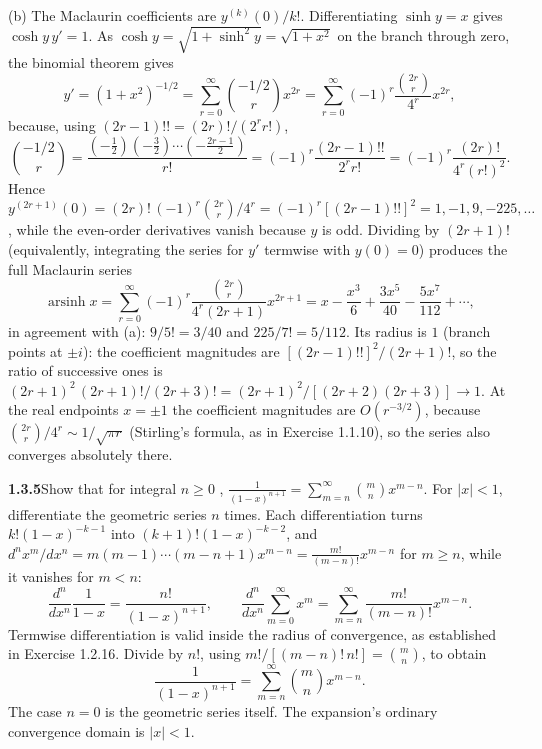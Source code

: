 (b) The Maclaurin coefficients are $y^{(k)}(0)/k!$.
Differentiating $\sinh y=x$ gives $\cosh y\,y'=1$.
As $\cosh y=\sqrt{1+\sinh^2y}=\sqrt{1+x^2}$ on the branch through zero,
the binomial theorem gives
\[
 y'=(1+x^2)^{-1/2}=\sum_{r=0}^\infty\binom{-1/2}{r}x^{2r}
 =\sum_{r=0}^\infty(-1)^r\frac{\binom{2r}{r}}{4^r}x^{2r},
\]
because, using $(2r-1)!!=(2r)!/(2^rr!)$,
\[
 \binom{-1/2}{r}
 =\frac{(-\frac12)(-\frac32)\cdots(-\frac{2r-1}2)}{r!}
 =(-1)^r\frac{(2r-1)!!}{2^rr!}=(-1)^r\frac{(2r)!}{4^r(r!)^2}.
\]
Hence
$y^{(2r+1)}(0)=(2r)!\,(-1)^r\binom{2r}r/4^r=(-1)^r[(2r-1)!!]^2
=1,-1,9,-225,\ldots$, while the even-order derivatives vanish because
$y$ is odd. Dividing by $(2r+1)!$ (equivalently, integrating the series
for $y'$ termwise with $y(0)=0$) produces the full Maclaurin series
\[
 \boxed{\operatorname{arsinh}x
 =\sum_{r=0}^\infty(-1)^r\frac{\binom{2r}{r}}{4^r(2r+1)}x^{2r+1}
 =x-\frac{x^3}6+\frac{3x^5}{40}-\frac{5x^7}{112}+\cdots},
\]
in agreement with (a): $9/5!=3/40$ and $225/7!=5/112$.
Its radius is $1$ (branch points at $\pm i$): the coefficient
magnitudes are $[(2r-1)!!]^2/(2r+1)!$, so the ratio of successive ones is
$(2r+1)^2\,(2r+1)!/(2r+3)!=(2r+1)^2/[(2r+2)(2r+3)]\to1$. At the real
endpoints $x=\pm1$ the coefficient magnitudes are $O(r^{-3/2})$, because
$\binom{2r}r/4^r\sim1/\sqrt{\pi r}$ (Stirling's formula, as in
Exercise 1.1.10), so the series also converges absolutely there.


\par\bigskip
\noindent\textbf{1.3.5}\quad Show that for integral $n\geq0$ ,
$\displaystyle\frac{1}{(1-x)^{n+1}}=\sum_{m=n}^{\infty}\binom{m}{n}x^{m-n}$.
\solution
For $|x|<1$, differentiate the geometric series $n$ times. Each
differentiation turns $k!(1-x)^{-k-1}$ into $(k+1)!(1-x)^{-k-2}$, and
$d^nx^m/dx^n=m(m-1)\cdots(m-n+1)x^{m-n}=\frac{m!}{(m-n)!}x^{m-n}$ for
$m\ge n$, while it vanishes for $m<n$:
\[
 \frac{d^n}{dx^n}\frac1{1-x}=\frac{n!}{(1-x)^{n+1}},\qquad
 \frac{d^n}{dx^n}\sum_{m=0}^\infty x^m
 =\sum_{m=n}^\infty\frac{m!}{(m-n)!}x^{m-n}.
\]
Termwise differentiation is valid inside the radius of convergence,
as established in Exercise 1.2.16. Divide by $n!$, using
$m!/[(m-n)!\,n!]=\binom mn$, to obtain
\[
 \frac1{(1-x)^{n+1}}=\sum_{m=n}^\infty\binom mn x^{m-n}.
\]
The case $n=0$ is the geometric series itself. The expansion's ordinary
convergence domain is $|x|<1$.


